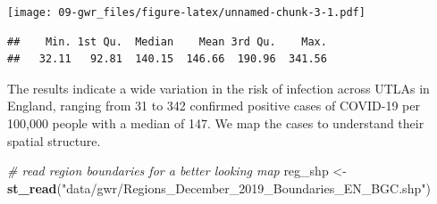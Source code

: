 \documentclass[
]{book}
\newenvironment{Shaded}{\begin{snugshade}}{\end{snugshade}}
\newcommand{\CommentTok}[1]{\textcolor[rgb]{0.56,0.35,0.01}{\textit{#1}}}
\newcommand{\DataTypeTok}[1]{\textcolor[rgb]{0.13,0.29,0.53}{#1}}
\newcommand{\DecValTok}[1]{\textcolor[rgb]{0.00,0.00,0.81}{#1}}
\newcommand{\FloatTok}[1]{\textcolor[rgb]{0.00,0.00,0.81}{#1}}
\newcommand{\KeywordTok}[1]{\textcolor[rgb]{0.13,0.29,0.53}{\textbf{#1}}}
\newcommand{\NormalTok}[1]{#1}
\newcommand{\OperatorTok}[1]{\textcolor[rgb]{0.81,0.36,0.00}{\textbf{#1}}}
\newcommand{\StringTok}[1]{\textcolor[rgb]{0.31,0.60,0.02}{#1}}
\begin{document}
\begin{Shaded}
\end{Shaded}

\texttt{[image: 09-gwr\_files/figure-latex/unnamed-chunk-3-1.pdf]}

\begin{Shaded}
\end{Shaded}

\begin{verbatim}
##    Min. 1st Qu.  Median    Mean 3rd Qu.    Max. 
##   32.11   92.81  140.15  146.66  190.96  341.56
\end{verbatim}

The results indicate a wide variation in the risk of infection across UTLAs in England, ranging from 31 to 342 confirmed positive cases of COVID-19 per 100,000 people with a median of 147. We map the cases to understand their spatial structure.

\begin{Shaded}
\begin{Highlighting}[]
\CommentTok{# read region boundaries for a better looking map}
\NormalTok{reg_shp <-}\StringTok{ }\KeywordTok{st_read}\NormalTok{(}\StringTok{"data/gwr/Regions_December_2019_Boundaries_EN_BGC.shp"}\NormalTok{)}
\end{Highlighting}
\end{Shaded}
\end{document}
